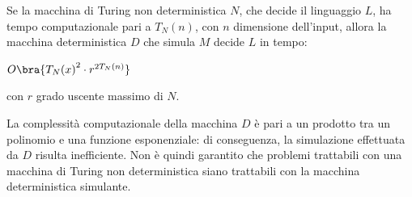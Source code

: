 \begin{thm}
    Se la macchina di Turing non deterministica $N$, che decide il
    linguaggio $L$, ha tempo computazionale pari a $T_N (n)$, con $n$
    dimensione dell'input, allora la macchina deterministica $D$ che
    simula $M$ decide $L$ in tempo:
    \begin{center}
        $O\bra{{T_N(x)}^2 \cdot r^{2T_N(n)}}$
    \end{center}
    con $r$ grado uscente massimo di $N$.
\end{thm}
\begin{rem}
    La complessità computazionale della macchina $D$ è pari a un prodotto
    tra un polinomio e una funzione esponenziale: di conseguenza, la
    simulazione effettuata da $D$ risulta inefficiente. Non è quindi garantito
    che problemi trattabili con una macchina di Turing non deterministica
    siano trattabili con la macchina deterministica simulante.
\end{rem}
